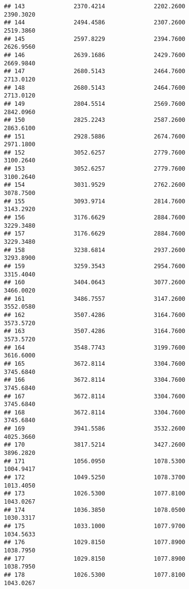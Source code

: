 \documentclass[]{article}
\begin{document}
\begin{verbatim}
## 143              2370.4214              2202.2600           2390.3020
## 144              2494.4586              2307.2600           2519.3860
## 145              2597.8229              2394.7600           2626.9560
## 146              2639.1686              2429.7600           2669.9840
## 147              2680.5143              2464.7600           2713.0120
## 148              2680.5143              2464.7600           2713.0120
## 149              2804.5514              2569.7600           2842.0960
## 150              2825.2243              2587.2600           2863.6100
## 151              2928.5886              2674.7600           2971.1800
## 152              3052.6257              2779.7600           3100.2640
## 153              3052.6257              2779.7600           3100.2640
## 154              3031.9529              2762.2600           3078.7500
## 155              3093.9714              2814.7600           3143.2920
## 156              3176.6629              2884.7600           3229.3480
## 157              3176.6629              2884.7600           3229.3480
## 158              3238.6814              2937.2600           3293.8900
## 159              3259.3543              2954.7600           3315.4040
## 160              3404.0643              3077.2600           3466.0020
## 161              3486.7557              3147.2600           3552.0580
## 162              3507.4286              3164.7600           3573.5720
## 163              3507.4286              3164.7600           3573.5720
## 164              3548.7743              3199.7600           3616.6000
## 165              3672.8114              3304.7600           3745.6840
## 166              3672.8114              3304.7600           3745.6840
## 167              3672.8114              3304.7600           3745.6840
## 168              3672.8114              3304.7600           3745.6840
## 169              3941.5586              3532.2600           4025.3660
## 170              3817.5214              3427.2600           3896.2820
## 171              1056.0950              1078.5300           1004.9417
## 172              1049.5250              1078.3700           1013.4050
## 173              1026.5300              1077.8100           1043.0267
## 174              1036.3850              1078.0500           1030.3317
## 175              1033.1000              1077.9700           1034.5633
## 176              1029.8150              1077.8900           1038.7950
## 177              1029.8150              1077.8900           1038.7950
## 178              1026.5300              1077.8100           1043.0267

\end{verbatim}
\end{document}
